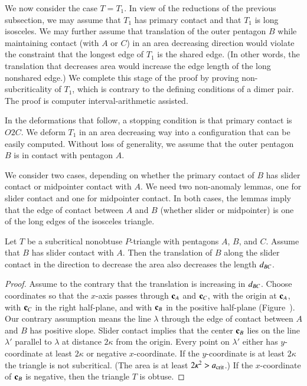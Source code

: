 We now consider the case $T=T_1$.  In view of the reductions of the
previous subsection, we may assume that $T_1$ has primary contact and
that $T_1$ is long isosceles.  We may further assume that translation
of the outer pentagon $B$ while maintaining contact (with $A$ or $C$)
in an area decreasing direction would violate the constraint that the
longest edge of $T_1$ is the shared edge.  (In other words, the
translation that decreases area would increase the edge length of the
long nonshared edge.)  We complete this stage of the proof by proving
non-subcriticality of $T_1$, which is contrary to the defining
conditions of a dimer pair.  The proof is computer interval-arithmetic
assisted.

In the deformations that follow, a stopping condition is that
primary contact is $O2C$.
We deform $T_1$ in an area decreasing
way into a configuration that can be easily computed.  Without loss of
generality, we assume that the outer pentagon $B$ is in contact with
pentagon $A$.  

We consider two cases, depending on whether the primary contact of $B$
has slider contact or midpointer contact with $A$.  We need two
non-anomaly lemmas, one for slider contact and one for midpointer
contact.  In both cases, the lemmas imply that the edge of contact
between $A$ and $B$ (whether slider or midpointer) is one of the long
edges of the isosceles triangle.

\begin{lemma}  
  Let $T$ be a subcritical nonobtuse $P$-triangle with pentagons $A$,
  $B$, and $C$.  Assume that $B$ has slider contact with $A$.  Then
  the translation of $B$ along the slider contact in the direction to
  decrease the area also decreases the length $d_{BC}$.
\end{lemma}

\begin{proof} 
  Assume to the contrary that the translation is increasing in
  $d_{BC}$.  Choose coordinates so that the $x$-axis passes through
  ${\mathbf c}_A$ and ${\mathbf c}_C$, with the origin at ${\mathbf c}_A$, with ${\mathbf c}_C$ in the
  right half-plane, and with ${\mathbf c}_B$ in the positive half-plane
  (Figure~).  Our contrary assumption means the 
  line $\lambda$ through the edge of contact between $A$ and $B$ has
  positive slope.  Slider contact implies that the center ${\mathbf c}_B$ lies
  on the line $\lambda'$ parallel to $\lambda$ at distance $2\kappa$
  from the origin.  Every point on $\lambda'$ either has
  $y$-coordinate at least $2\kappa$ or negative $x$-coordinate.  If
  the $y$-coordinate is at least $2\kappa$ the triangle is not
  subcritical.  (The area is at least $2\kappa^2>a_\text{crit}$.) If the
  $x$-coordinate of ${\mathbf c}_B$ is negative, then the triangle $T$ is
  obtuse.
\end{proof}

